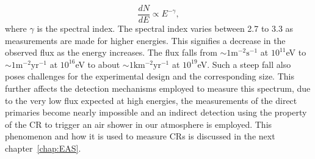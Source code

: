 \begin{equation}
  \label{eq:Powlaw}
  \frac{dN}{dE} \propto E^{-\gamma},   
\end{equation}
where $\gamma$ is the spectral index. The spectral index varies between 2.7 to 3.3 as measurements are made for higher energies. This signifies a decrease in the observed flux as the energy increases. The flux falls from $\mathrm{\sim 1m^{-2} s^{-1}}$ at $10^{11}$eV to $\mathrm{\sim 1m^{-2} yr^{-1}}$ at $10^{16}$eV to about $\mathrm{\sim 1km^{-2} yr^{-1}}$ at $10^{19}$eV. Such a steep fall also poses challenges for the experimental design and the corresponding size. This further affects the detection mechanisms employed to measure this spectrum, due to the very low flux expected at high energies, the measurements of the direct primaries become nearly impossible and an indirect detection using the property of the \gls{CR} to trigger an air shower in our atmosphere is employed. This phenomenon and how it is used to measure \glspl{CR} is discussed in the next chapter~\ref{chap:EAS}.


